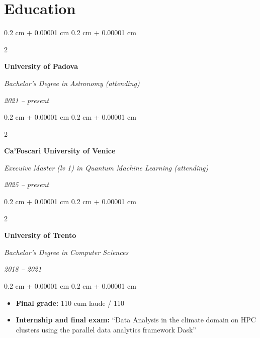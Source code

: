\documentclass[10pt, a4paper]{article}
\newenvironment{highlights}{
    \begin{itemize}[
        topsep=0.10 cm,
        parsep=0.10 cm,
        partopsep=0pt,
        itemsep=0pt,
        leftmargin=0.4 cm + 10pt
    ]
}{
    \end{itemize}
} %
\newenvironment{onecolentry}{
    \begin{adjustwidth}{
        0.2 cm + 0.00001 cm
    }{
        0.2 cm + 0.00001 cm
    }
}{
    \end{adjustwidth}
} %
\newenvironment{twocolentry}[2][]{
    \onecolentry
    \def\secondColumn{#2}
    \setcolumnwidth{\fill, 6.5 cm}
    \begin{paracol}{2}
}{
    \switchcolumn \raggedleft \secondColumn
    \end{paracol}
    \endonecolentry
} %
\begin{document}
    
    \section{Education}



        
        \begin{twocolentry}{
            
            
        \textit{2021 – present}}
            \textbf{University of Padova}

            \textit{Bachelor's Degree in Astronomy (attending)}
        \end{twocolentry}



        \vspace{0.4 cm}

        \begin{twocolentry}{
            
            
        \textit{2025 – present}}
            \textbf{Ca'Foscari University of Venice}

            \textit{Execuive Master (lv 1) in Quantum Machine Learning (attending)}
        \end{twocolentry}



        \vspace{0.4 cm}

        \begin{twocolentry}{
            
            
        \textit{2018 – 2021}}
            \textbf{University of Trento}

            \textit{Bachelor's Degree in Computer Sciences}
        \end{twocolentry}

        \vspace{0.10 cm}
        \begin{onecolentry}
            \begin{highlights}
                \item \textbf{Final grade:} 110 cum laude / 110
                \item \textbf{Internship and final exam:} “Data Analysis in the climate domain on HPC clusters using the parallel data analytics framework Dask”
            \end{highlights}
        \end{onecolentry}


        \vspace{0.4 cm}
\end{document}
